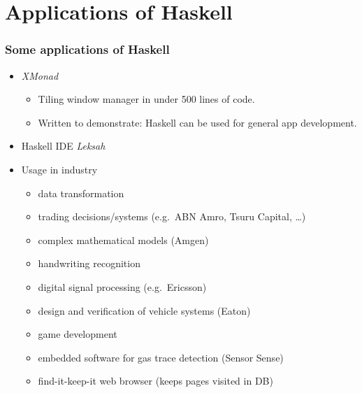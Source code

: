 \section{Applications of Haskell}

\begin{frame}
  \frametitle{Some applications of Haskell}
  \begin{itemize}
    \item \emph{XMonad}
      \begin{itemize}
        \item Tiling window manager in under 500 lines of code.
        \item Written to demonstrate: Haskell can be used for general app development.
      \end{itemize}
    \item Haskell IDE \emph{Leksah}  
    \item Usage in industry
      \begin{itemize}
        \item data transformation 
        \item trading decisions/systems (e.g.\ ABN Amro, Tsuru Capital, \ldots)
        \item complex mathematical models (Amgen)
        \item handwriting recognition 
        \item digital signal processing (e.g.\ Ericsson)    
        \item design and verification of vehicle systems (Eaton)
        \item game development
        \item embedded software for gas trace detection (Sensor Sense)
        \item find-it-keep-it web browser (keeps pages visited in DB)
      \end{itemize}
  \end{itemize}
\end{frame}